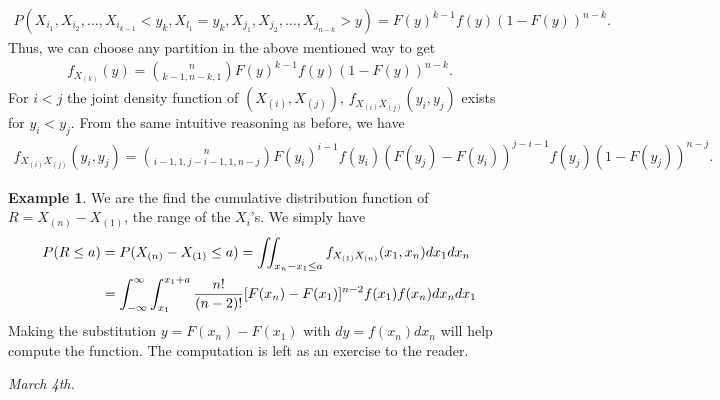 \documentclass[15pt,a4paper]{book}
\theoremstyle{definition}
\newtheorem{example}[theorem]{Example}
\begin{document}
\begin{align}
    P(X_{i_{1}},X_{i_{2}},\ldots,X_{i_{k-1}}<y_{k}, X_{l_{1}}=y_{k},X_{j_{1}},X_{j_{2}},\ldots,X_{j_{n-k}} > y) = F(y)^{k-1}f(y)(1-F(y))^{n-k}.
\end{align}
Thus, we can choose any partition in the above mentioned way to get
\begin{align}
    f_{X_{(k)}}(y) = \binom{n}{k-1,n-k,1} F(y)^{k-1}f(y)(1-F(y))^{n-k}.
\end{align}
For $i < j$ the joint density function of $(X_{(i)},X_{(j)})$, $f_{X_{(i)}X_{(j)}}(y_{i},y_{j})$ exists for $y_{i}<y_{j}$. From the same intuitive reasoning as before, we have
\begin{align}
    f_{X_{(i)}X_{(j)}}(y_{i},y_{j}) = \binom{n}{i-1,1,j-i-1,1,n-j} F(y_{i})^{i-1} f(y_{i})(F(y_{j})-F(y_{i}))^{j-i-1}f(y_{j})(1-F(y_{j}))^{n-j}.
\end{align}
\begin{example}
    We are the find the cumulative distribution function of $R = X_{(n)}-X_{(1)}$, the range of the $X_{i}$'s. We simply have
    \begin{align}
        P(R \leq a) &= P(X_{(n)}-X_{(1)} \leq a) = \iint_{x_{n}-x_{1} \leq a} f_{X_{(1)}X_{(n)}}(x_{1},x_{n}) dx_{1} dx_{n} \\
        &= \int_{-\infty}^{\infty} \int_{x_{1}}^{x_{1}+a} \frac{n!}{(n-2)!}[F(x_{n})-F(x_{1})]^{n-2}f(x_{1})f(x_{n}) dx_{n} dx_{1} \notag
    \end{align}
    Making the substitution $y = F(x_{n}) - F(x_{1})$ with $dy = f(x_{n})dx_{n}$ will help compute the function. The computation is left as an exercise to the reader.
\end{example}

\textit{March 4th.}
\end{document}
